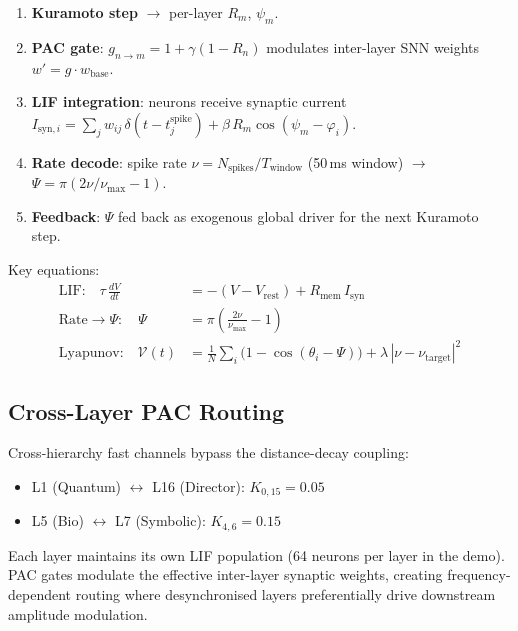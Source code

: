 \documentclass[11pt,a4paper]{article}
\begin{document}
\begin{enumerate}
  \item \textbf{Kuramoto step} $\to$ per-layer $R_m$, $\psi_m$.
  \item \textbf{PAC gate}: $g_{n\to m} = 1 + \gamma(1 - R_n)$ modulates
        inter-layer SNN weights $w' = g \cdot w_{\text{base}}$.
  \item \textbf{LIF integration}: neurons receive synaptic current
        $I_{\text{syn},i} = \sum_j w_{ij}\,\delta(t - t_j^{\text{spike}})
        + \beta\,R_m\cos(\psi_m - \varphi_i)$.
  \item \textbf{Rate decode}: spike rate
        $\nu = N_{\text{spikes}}/T_{\text{window}}$ (50\,ms window)
        $\to$ $\Psi = \pi(2\nu/\nu_{\max} - 1)$.
  \item \textbf{Feedback}: $\Psi$ fed back as exogenous global driver for the
        next Kuramoto step.
\end{enumerate}

Key equations:
\begin{align}
  \text{LIF:}\quad \tau\,\frac{dV}{dt} &= -(V - V_{\text{rest}}) + R_{\text{mem}}\,I_{\text{syn}}
  \label{eq:lif}\\[3pt]
  \text{Rate}\to\Psi:\quad \Psi &= \pi\!\left(\frac{2\nu}{\nu_{\max}} - 1\right)
  \label{eq:rate2psi}\\[3pt]
  \text{Lyapunov:}\quad \mathcal{V}(t) &= \frac{1}{N}\sum_i\bigl(1 - \cos(\theta_i - \Psi)\bigr)
  + \lambda\,|\nu - \nu_{\text{target}}|^2
  \label{eq:lyapunov_snn}
\end{align}

\subsection{Cross-Layer PAC Routing}

Cross-hierarchy fast channels bypass the distance-decay coupling:

\begin{itemize}
  \item L1 (Quantum) $\leftrightarrow$ L16 (Director): $K_{0,15}=0.05$
  \item L5 (Bio) $\leftrightarrow$ L7 (Symbolic): $K_{4,6}=0.15$
\end{itemize}

Each layer maintains its own LIF population (64 neurons per layer in the demo).
PAC gates modulate the effective inter-layer synaptic weights, creating
frequency-dependent routing where desynchronised layers preferentially
drive downstream amplitude modulation.
\end{document}

